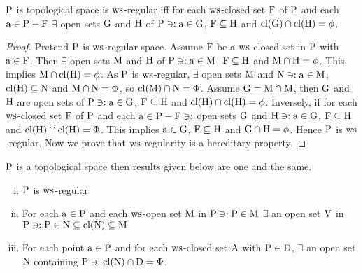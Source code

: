 \begin{thm}\label{thm8.3.8}
$\mathrm{P}$ is topological space is $\mathrm{ws}$-regular iff for each $\mathrm{ws}$-closed set $\mathrm{F}$ of $\mathrm{P}$ and each $\mathrm{a} \in \mathrm{P} -\mathrm{F}$ $\exists$ open sets $\mathrm{G}$ and $\mathrm{H}$ of $\mathrm{P} \ni: \mathrm{a} \in \mathrm{G}$, $\mathrm{F} \subseteq \mathrm{H}$ and $\mathrm{cl}(\mathrm{G}) \cap \mathrm{cl}(\mathrm{H}) = \phi$.
\end{thm}

\begin{proof}
Pretend $\mathrm{P}$ is $\mathrm{ws}$-regular space. Assume $\mathrm{F}$ be a $\mathrm{ws}$-closed set in $\mathrm{P}$ with $\mathrm{a} \in \mathrm{F}$. Then $\exists$ open sets $\mathrm{M}$ and $\mathrm{H}$ of $\mathrm{P} \ni: \mathrm{a} \in \mathrm{M}$, $\mathrm{F} \subseteq \mathrm{H}$ and $\mathrm{M} \cap\mathrm{H} = \phi$. This implies $\mathrm{M} \cap \mathrm{cl}(\mathrm{H}) = \phi$. As $\mathrm{P}$ is $\mathrm{ws}$-regular, $\exists$ open sets $\mathrm{M}$ and $\mathrm{N} \ni: \mathrm{a} \in \mathrm{M}$, $\mathrm{cl}(\mathrm{H}) \subseteq \mathrm{N}$ and $\mathrm{M} \cap \mathrm{N} = \Phi$, so $\mathrm{cl}(\mathrm{M}) \cap \mathrm{N} = \Phi$. Assume $\mathrm{G} = \mathrm{M} \cap \mathrm{M}$, then $\mathrm{G}$ and $\mathrm{H}$ are open sets of $\mathrm{P} \ni: \mathrm{a} \in \mathrm{G}$, $\mathrm{F} \subseteq \mathrm{H}$ and $\mathrm{cl}(\mathrm{H}) \cap \mathrm{cl}(\mathrm{H}) = \phi$. Inversely, if for each $\mathrm{ws}$-closed set $\mathrm{F}$ of $\mathrm{P}$ and each $\mathrm{a} \in \mathrm{P}- \mathrm{F} \ni:$ open sets $\mathrm{G}$ and $\mathrm{H} \ni: \mathrm{a} \in \mathrm{G}$, $\mathrm{F} \subseteq \mathrm{H}$ and $\mathrm{cl}(\mathrm{H}) \cap \mathrm{cl}(\mathrm{H}) = \Phi$. This implies $\mathrm{a} \in \mathrm{G}$, $\mathrm{F} \subseteq \mathrm{H}$ and $\mathrm{G} \cap \mathrm{H} = \phi$. Hence $\mathrm{P}$ is $\mathrm{ws}$-regular. Now we prove that $\mathrm{ws}$-regularity is a hereditary property.
\end{proof}

\begin{thm}\label{thm8.3.9}
$\mathrm{P}$ is a topological space then results given below are one and the same.
\begin{enumerate}[(i)]
\item $\mathrm{P}$ is $\mathrm{ws}$-regular
\item For each $\mathrm{a} \in \mathrm{P}$ and each $\mathrm{ws}$-open set $\mathrm{M}$ in $\mathrm{P} \ni: \mathrm{P} \in \mathrm{M}$ $\exists$ an open set $\mathrm{V}$ in $\mathrm{P} \ni: \mathrm{P} \in \mathrm{N} \subseteq \mathrm{cl}(\mathrm{N}) \subseteq \mathrm{M}$
\item For each point $\mathrm{a}\in \mathrm{P}$ and for each $\mathrm{ws}$-closed set $\mathrm{A}$ with $\mathrm{P} \in \mathrm{D}$, $\exists$ an open set $\mathrm{N}$ containing $\mathrm{P} \ni: \mathrm{cl}(\mathrm{N}) \cap \mathrm{D} = \Phi$.
\end{enumerate}
\end{thm}

